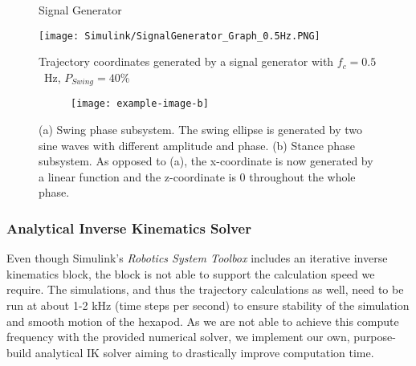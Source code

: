 
\begin{figure}[!h]
	\centerline{}
	\caption{Signal Generator}
	\label{figure: Signal Generator}
\end{figure}

\begin{figure}[!h]
	\centerline{\texttt{[image: Simulink/SignalGenerator\_Graph\_0.5Hz.PNG]}}
	\caption{Trajectory coordinates generated by a signal generator with $f_c=0.5$\ Hz, $P_{Swing}=40\text{\%}$}
	\label{figure: Trajectory graphs}
\end{figure}

\begin{figure}[!h]
	\centering
	\begin{subfigure}[b]{0.55\textwidth}
		
		\caption{}
		\label{fig:Ng1} 
	\end{subfigure}
	
	\begin{subfigure}[b]{0.55\textwidth}
	\texttt{[image: example-image-b]}
		\caption{}
		\label{fig:Ng2}
	\end{subfigure}
	
	\caption[Swing and Stance Phase]{(a) Swing phase subsystem. The swing ellipse is generated by two sine waves with different amplitude and phase. (b) Stance phase subsystem. As opposed to (a), the x-coordinate is now generated by a linear function and the z-coordinate is 0 throughout the whole phase.}
\end{figure}


\subsubsection{Analytical Inverse Kinematics Solver} \label{subsubsec: IK Solver}
Even though Simulink's \textit{Robotics System Toolbox} includes an iterative inverse kinematics block, the block is not able to support the calculation speed we require.
The simulations, and thus the trajectory calculations as well, need to be run at about 1-2 kHz (time steps per second) to ensure stability of the simulation and smooth motion of the hexapod.
As we are not able to achieve this compute frequency with the provided numerical solver, we implement our own, purpose-build analytical IK solver aiming to drastically improve computation time.

